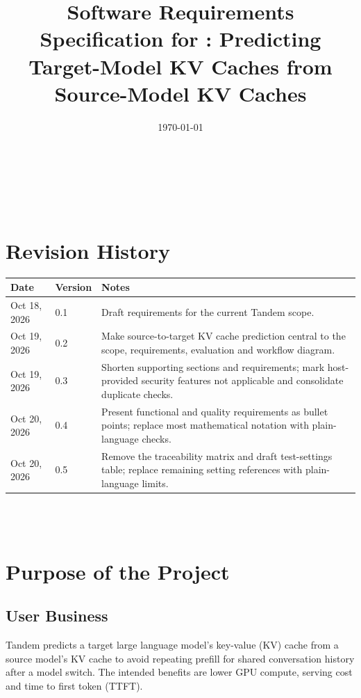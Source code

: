 \documentclass[12pt]{article}
\begin{document}
\title{Software Requirements Specification for \progname: Predicting Target-Model KV Caches from Source-Model KV Caches}
\author{\authname}
\date{\today}
	
\maketitle

~\newpage


\tableofcontents

~\newpage

\section*{Revision History}

\begin{tabularx}{\textwidth}{p{3cm}p{2cm}X}
\toprule {\textbf{Date}} & {\textbf{Version}} & {\textbf{Notes}}\\
\midrule
Oct 18, 2026 & 0.1 & Draft requirements for the current Tandem scope.\\
Oct 19, 2026 & 0.2 & Make source-to-target KV cache prediction central to the scope, requirements, evaluation and workflow diagram.\\
Oct 19, 2026 & 0.3 & Shorten supporting sections and requirements; mark host-provided security features not applicable and consolidate duplicate checks.\\
Oct 20, 2026 & 0.4 & Present functional and quality requirements as bullet points; replace most mathematical notation with plain-language checks.\\
Oct 20, 2026 & 0.5 & Remove the traceability matrix and draft test-settings table; replace remaining setting references with plain-language limits.\\
\bottomrule
\end{tabularx}

~\\

~\newpage
\section{Purpose of the Project}


\subsection{User Business}
Tandem predicts a target large language model's key-value (KV) cache from a
source model's KV cache to avoid repeating prefill for shared conversation
history after a model switch. The intended benefits are lower GPU compute,
serving cost and time to first token (TTFT).
\end{document}

